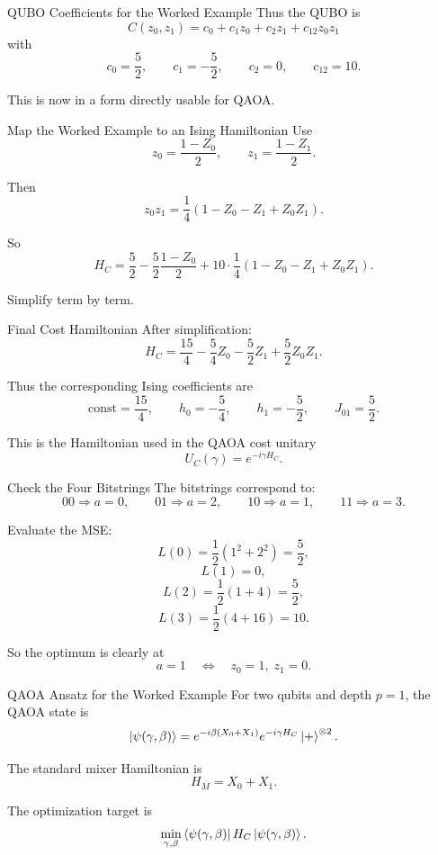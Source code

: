 \documentclass{beamer}
\begin{document}
\begin{frame}{QUBO Coefficients for the Worked Example}
Thus the QUBO is
\[
C(z_0,z_1)=c_0+c_1 z_0 + c_2 z_1 + c_{12} z_0 z_1
\]
with
\[
c_0=\frac52,\qquad
c_1=-\frac52,\qquad
c_2=0,\qquad
c_{12}=10.
\]

This is now in a form directly usable for QAOA.
\end{frame}

\begin{frame}{Map the Worked Example to an Ising Hamiltonian}
Use
\[
z_0=\frac{1-Z_0}{2},\qquad
z_1=\frac{1-Z_1}{2}.
\]

Then
\[
z_0 z_1=\frac14(1-Z_0-Z_1+Z_0Z_1).
\]

So
\[
H_C
=
\frac52
-\frac52 \frac{1-Z_0}{2}
+10\cdot \frac14(1-Z_0-Z_1+Z_0Z_1).
\]

Simplify term by term.
\end{frame}

\begin{frame}{Final Cost Hamiltonian}
After simplification:
\[
H_C
=
\frac{15}{4}
-\frac{5}{4} Z_0
-\frac{5}{2} Z_1
+\frac{5}{2} Z_0 Z_1.
\]

Thus the corresponding Ising coefficients are
\[
\text{const}=\frac{15}{4},\qquad
h_0=-\frac54,\qquad
h_1=-\frac52,\qquad
J_{01}=\frac52.
\]

This is the Hamiltonian used in the QAOA cost unitary
\[
U_C(\gamma)=e^{-i\gamma H_C}.
\]
\end{frame}

\begin{frame}{Check the Four Bitstrings}
The bitstrings correspond to:
\[
00 \Rightarrow a=0,\qquad
01 \Rightarrow a=2,\qquad
10 \Rightarrow a=1,\qquad
11 \Rightarrow a=3.
\]

Evaluate the MSE:
\[
L(0)=\frac12(1^2+2^2)=\frac52,
\]
\[
L(1)=0,
\]
\[
L(2)=\frac12(1+4)=\frac52,
\]
\[
L(3)=\frac12(4+16)=10.
\]

So the optimum is clearly at
\[
a=1 \quad \Longleftrightarrow \quad z_0=1,\; z_1=0.
\]
\end{frame}

\begin{frame}{QAOA Ansatz for the Worked Example}
For two qubits and depth \(p=1\), the QAOA state is
\[
\ket{\psi(\gamma,\beta)}
=
e^{-i\beta(X_0+X_1)} e^{-i\gamma H_C} \ket{+}^{\otimes 2}.
\]

The standard mixer Hamiltonian is
\[
H_M = X_0 + X_1.
\]

The optimization target is
\[
\min_{\gamma,\beta} \bra{\psi(\gamma,\beta)} H_C \ket{\psi(\gamma,\beta)}.
\]
\end{frame}
\end{document}
